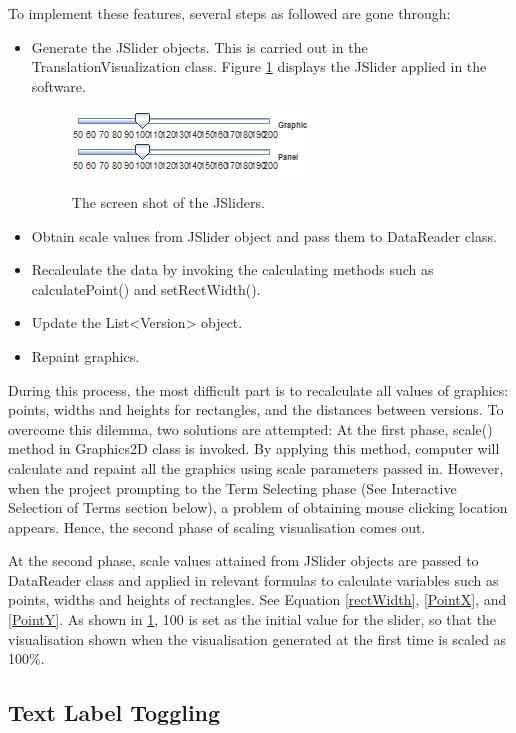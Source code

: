 To implement these features, several steps as followed are gone through:
\begin{itemize}
	\item \textbf{} Generate the JSlider objects. This is carried out in the TranslationVisualization class. Figure \ref{fig:jSliders} displays the JSlider applied in the software.
	\begin{figure}[H]
		\centering	
		\includegraphics[scale=1]{Figs/JSliders}\\[1ex]
		\caption{The screen shot of the JSliders.}
		\label{fig:jSliders}
	\end{figure} 	
	\item \textbf{} Obtain scale values from JSlider object and pass them to DataReader class.
	\item \textbf{} Recalculate the data by invoking the calculating methods such as calculatePoint() and setRectWidth().
	\item \textbf{} Update the List<Version> object.
	\item \textbf{} Repaint graphics.
\end{itemize} 
 
During this process, the most difficult part is to recalculate all values of graphics: points, widths and heights for rectangles, and the distances between versions. To overcome this dilemma, two solutions are attempted:
At the first phase, scale() method in Graphics2D class is invoked. By applying this method, computer will calculate and repaint all the graphics using scale parameters passed in. However, when the project prompting to the Term Selecting phase (See Interactive Selection of Terms section below), a problem of obtaining mouse clicking location appears. Hence, the second phase of scaling visualisation comes out.  

At the second phase, scale values attained from JSlider objects are passed to DataReader class and applied in relevant formulas to calculate variables such as points, widths and heights of rectangles. See Equation \eqref{rectWidth}, \eqref{PointX}, and \eqref{PointY}. As shown in \ref{fig:jSliders}, 100 is set as the initial value for the slider, so that the visualisation shown when the visualisation generated at the first time is scaled as 100\%. 
\subsection{Text Label Toggling}

